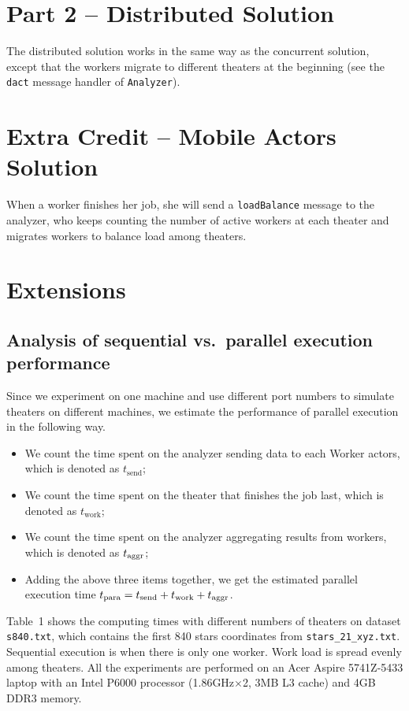 \documentclass[12pt,letterpaper]{article}
\begin{document}
\section*{Part 2 -- Distributed Solution}
The distributed solution works in the same way as the concurrent solution, except that the workers migrate to different theaters at the beginning (see the \texttt{dact} message handler of \texttt{Analyzer}).

\section*{Extra Credit -- Mobile Actors Solution}
When a worker finishes her job, she will send a \texttt{loadBalance} message to the analyzer, who keeps counting the number of active workers at each theater and migrates workers to balance load among theaters.

\section*{Extensions}
\subsection*{Analysis of sequential vs.~parallel execution performance}
Since we experiment on one machine and use different port numbers to simulate theaters on different machines, we estimate the performance of parallel execution in the following way.
\begin{itemize}
\item We count the time spent on the analyzer sending data to each Worker actors, which is denoted as $t_{\textrm{send}}$;
\item We count the time spent on the theater that finishes the job last, which is denoted as $t_{\textrm{work}}$;
\item We count the time spent on the analyzer aggregating results from workers, which is denoted as $t_{\rm aggr}$;
\item Adding the above three items together, we get the estimated parallel execution time $t_{\rm para} = t_{\textrm{send}}+t_{\textrm{work}}+t_{\rm aggr}$.
\end{itemize}

Table~1 shows the computing times with different numbers of theaters on dataset \texttt{s840.txt}, which contains the first 840 stars coordinates from \texttt{stars\_21\_xyz.txt}. Sequential execution is when there is only one worker. Work load is spread evenly among theaters. All the experiments are performed on an Acer Aspire 5741Z-5433 laptop with an Intel P6000 processor (1.86GHz$\times$2, 3MB L3 cache) and 4GB DDR3 memory.
\end{document}
